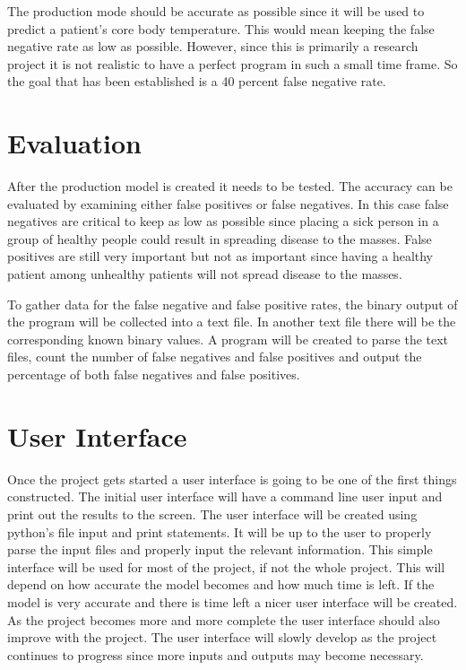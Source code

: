 ﻿\documentclass[onecolumn, draftclsnofoot,10pt, compsoc]{IEEEtran}
\begin{document}
The production mode should be accurate as possible since it will be used to predict a patient's core body temperature. This would mean keeping the false negative rate as low as possible. However, since this is primarily a research project it is not realistic to have a perfect program in such a small time frame. So the goal that has been established is a 40 percent false negative rate. \cite{BrianTech}


\section{Evaluation}

After the production model is created it needs to be tested. The accuracy can be evaluated by examining either false positives or false negatives. In this case false negatives are critical to keep as low as possible since placing a sick person in a group of healthy people could result in spreading disease to the masses. False positives are still very important but not as important since having a healthy patient among unhealthy patients will not spread disease to the masses.

To gather data for the false negative and false positive rates, the binary output of the program will be collected into a text file. In another text file there will be the corresponding known binary values. A program will be created to parse the text files, count the number of false negatives and false positives and output the percentage of both false negatives and false positives. 


\section{User Interface}
Once the project gets started a user interface is going to be one of the first things constructed. The initial user interface will have a command line user input and print out the results to the screen. The user interface will be created using python's file input and print statements. It will be up to the user to properly parse the input files and properly input the relevant information. This simple interface will be used for most of the project, if not the whole project. This will depend on how accurate the model becomes and how much time is left. If the model is very accurate and there is time left a nicer user interface will be created. As the project becomes more and more complete the user interface should also improve with the project. The user interface will slowly develop as the project continues to progress since more inputs and outputs may become necessary.
\end{document}
